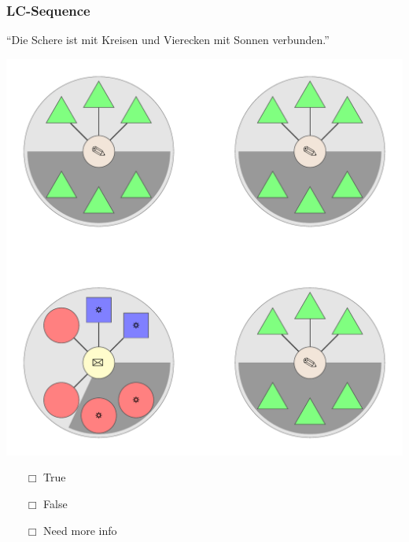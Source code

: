 \documentclass[fleqn,10pt,serif,xcolor=dvipsnames]{beamer}
\newcommand{\LC}{LC}
\newcommand{\mymark}[1]{{\color{blue}{#1}}}
\begin{document}
\begin{frame}
  \frametitle{\LC-Sequence}
  \begin{center}
    ``Die Schere ist mit Kreisen und Vierecken mit Sonnen verbunden.''

    \vspace{0.1cm}

    \includegraphics[width=0.5 \textwidth]{../../pictures/lc_01_3.pdf}

    \vspace{0.1cm}

    \begin{multicols}{3}
      \begin{itemize} 
      \item[$\Box$] True\\
        \onslide<2>{$\leadsto$  \mymark{LC}}
      \item[$\Box$] False\\
        \onslide<2>{$\leadsto$ \mymark{false}}
      \item[$\Box$] Need more info 
      \end{itemize}
    \end{multicols}

  \end{center}
\end{frame}
\end{document}
